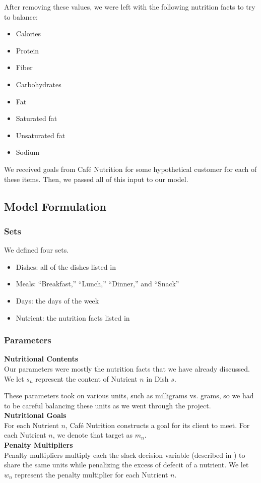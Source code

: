 \documentclass[twoside]{article}
\newcommand{\cn}{Caf\'e Nutrition\xspace}
\begin{document}
After removing these values, we were left with the following nutrition facts to try to balance:
\begin{itemize}
    \item Calories
    \item Protein
    \item Fiber
    \item Carbohydrates
    \item Fat
    \item Saturated fat
    \item Unsaturated fat
    \item Sodium
\end{itemize}

We received goals from \cn for some hypothetical customer for each of these items. Then, we passed all of this input to our model.
\subsection{Model Formulation}
\label{sec:model-formulation}
\subsubsection{Sets}
We defined four sets.
\begin{itemize}
    \item Dishes: all of the dishes listed in 
    \item Meals: ``Breakfast,'' ``Lunch,'' ``Dinner,'' and ``Snack''
    \item Days: the days of the week
    \item Nutrient: the nutrition facts listed in 
\end{itemize}

\subsubsection{Parameters}
\textbf{Nutritional Contents}\\[.1in]
\noindent
Our parameters were mostly the nutrition facts that we have already discussed. We let $s_n$ represent the content of Nutrient $n$ in Dish $s$.

These parameters took on various units, such as milligrams vs. grams, so we had to be careful balancing these units as we went through the project.\\[.1in]
\textbf{Nutritional Goals}\\[.1in]
\noindent For each Nutrient $n$, \cn constructs a goal for its client to meet. For each Nutrient $n$, we denote that target as $m_n$.\\[.1in]
\textbf{Penalty Multipliers}\\[.1in]
\noindent Penalty multipliers multiply each the slack decision variable (described in ) to share the same units while penalizing the excess of defecit of a nutrient. We let $w_n$ represent the penalty multiplier for each Nutrient $n$.
\end{document}
